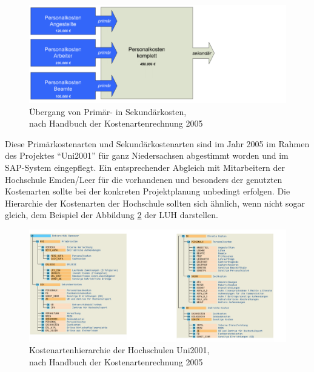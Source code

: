 \begin{figure}[h!]
	\centering
	\includegraphics[width=\textwidth]
	{kapitel/gruppe4_2/bilder/uebergang_primaerkosten}
	\caption{Übergang von Primär- in Sekundärkosten,\\nach Handbuch der Kostenartenrechnung 2005}
	\label{fig_uebergang_primaerkosten}
\end{figure}

Diese Primärkostenarten und Sekundärkostenarten sind im Jahr 2005 im Rahmen des Projektes “Uni2001” für ganz Niedersachsen abgestimmt worden und im SAP-System eingepflegt. Ein entsprechender Abgleich mit Mitarbeitern der Hochschule Emden/Leer für die vorhandenen und besonders der genutzten Kostenarten sollte bei der konkreten Projektplanung unbedingt erfolgen. Die Hierarchie der Kostenarten der Hochschule sollten sich ähnlich, wenn nicht sogar gleich, dem Beispiel der Abbildung \ref{fig_kostenartenhierarchie_uni2001} der LUH darstellen.

\begin{figure}[h!]
	\centering
	\includegraphics[width=\textwidth]
	{kapitel/gruppe4_2/bilder/kostenartenhierarchie_uni2001}
	\caption{Kostenartenhierarchie der Hochschulen Uni2001,\\nach Handbuch der Kostenartenrechnung 2005}
	\label{fig_kostenartenhierarchie_uni2001}
\end{figure}

\newpage